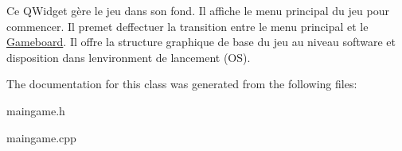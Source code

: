 Ce Q\+Widget gère le jeu dans son fond. Il affiche le menu principal du jeu pour commencer. Il premet d\textquotesingle{}effectuer la transition entre le menu principal et le \hyperlink{class_gameboard}{Gameboard}. Il offre la structure graphique de base du jeu au niveau software et disposition dans l\textquotesingle{}environment de lancement (O\+S). 

The documentation for this class was generated from the following files\+:\begin{DoxyCompactItemize}
\item 
maingame.\+h\item 
maingame.\+cpp\end{DoxyCompactItemize}
